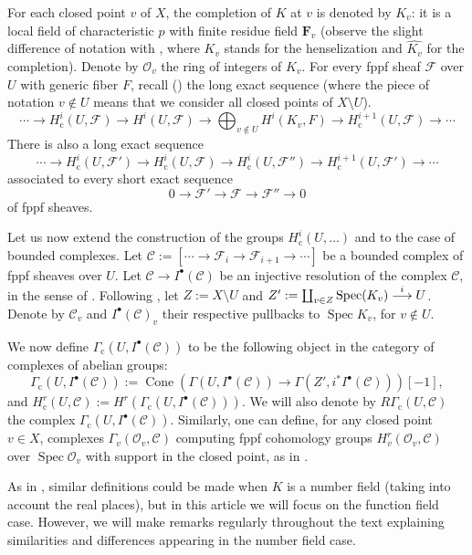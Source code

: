 \documentclass[10pt,a4paper]{amsart}
\let\mathcal\mathscr
\newcommand\To[1]{\mathchoice{\xrightarrow{\textstyle\kern4pt#1\kern3pt}}{\stackrel{#1}{\longrightarrow}}{}{}}
\newcommand{\sbullet}{{\scriptscriptstyle\bullet}}
\newcommand{\rc}{\mathrm{c}}
\theoremstyle{plain}
\theoremstyle{definition}
\DeclareMathOperator\Cone{Cone}
\DeclareMathOperator \spec {Spec}
\newcommand \FF {\mathbf{F}}
\newcommand\cF {\mathcal{F}}
\newcommand\cO {\mathcal{O}}
\newcommand \cC {\mathcal{C}}
\begin{document}
For each closed point $v$ of $X$, the completion of $K$ at $v$
is denoted by $K_v$: it is a local field of characteristic $p$ with
finite residue field $\FF_v$ (observe the slight difference of notation with
\cite{DemH}, where $K_v$ stands for the henselization and $\widehat{K_v}$
for the completion). Denote by $\cO_v$ the ring of integers of $K_v$.
For every fppf sheaf $\cF$
over $U$ with generic fiber $F$, recall (\cite[Prop.\,2.1]{DemH})
the long exact sequence (where the piece of notation $v \not \in U$ means
that we consider all closed points of $X\setminus U$).
\begin{equation} \label{suppcomp}
\cdots\to H^i_\rc(U,\cF) \to H^i(U,\cF) \to \bigoplus_{v \not
\in U} H^i(K_v,F) \to H^{i+1}_\rc(U,\cF) \to\cdots
\end{equation}
There is also a long exact sequence
\begin{equation} \label{longex1}
\cdots\to H^i_\rc(U,\cF') \to H^i_\rc(U,\cF) \to
H^i_\rc(U,\cF'') \to H^{i+1}_\rc(U,\cF ') \to\cdots
\end{equation}
associated to every short exact sequence
\[
0 \to \cF' \to \cF \to \cF'' \to 0
\]
of fppf sheaves.

Let us now extend the construction of the groups $H^i_\rc(U,\dots)$ and \cite[Prop.\,2.1]{DemH} to the case of bounded complexes.
Let $\cC:= [\cdots\to \cF_i \to \cF_{i+1} \to\cdots]$ be a bounded complex of fppf sheaves over $U$.
Let $\cC \to I^\sbullet(\cC)$ be an injective resolution of the complex $\cC$, in the sense of \cite[Tag 013K]{SP}.
Following \cite[\S2]{DemH}, let $Z:= X \setminus U$ and
$Z':= \coprod_{v \in Z} \spec({K_v}) \To{i} U$.
Denote by $\cC_v$ and $I^\sbullet(\cC)_v$ their respective
pullbacks to $\spec K_v$, for $v \notin U$.

We now define $\Gamma_\rc(U, I^\sbullet(\cC))$ to be the following object in the category of complexes of abelian groups:
\[
\Gamma_\rc(U, I^\sbullet(\cC)):= \Cone\left(\Gamma(U, I^\sbullet(\cC)) \to \Gamma(Z', i^* I^\sbullet(\cC)) \right)[-1],
\]
and $H^r_\rc(U, \cC):= H^r(\Gamma_\rc(U, I^\sbullet(\cC)))$. We will also denote by $R\Gamma_\rc(U,\cC)$ the complex $\Gamma_\rc(U, I^\sbullet(\cC))$.
Similarly, one can define, for any closed point $v \in X$, complexes $\Gamma_v(\cO_v, \cC)$ computing fppf cohomology groups $H^r_v(\cO_v, \cC)$ over $\spec \cO_v$ with support in the closed point, as in \cite[before Lem.\,2.6]{DemH}.

As in \cite{DemH}, similar definitions could be made when $K$ is a number field (taking into account the real places), but in this article we will focus on the function field case. However, we will make remarks regularly throughout the text explaining similarities and differences appearing in the number field case.
\end{document}
